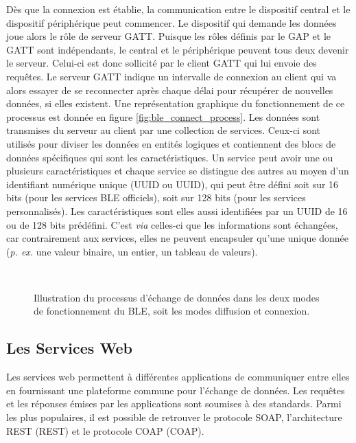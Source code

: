 Dès que la connexion est établie, la communication entre le dispositif central et le dispositif périphérique peut commencer. Le dispositif qui demande les données joue alors le rôle de serveur \acs{GATT}. Puisque les rôles définis par le \acs{GAP} et le \acs{GATT} sont indépendants, le central et le périphérique peuvent tous deux devenir le serveur. Celui-ci est donc sollicité par le client \acs{GATT} qui lui envoie des requêtes. Le serveur \acs{GATT} indique un intervalle de connexion au client qui va alors essayer de se reconnecter après chaque délai pour récupérer de nouvelles données, si elles existent. Une représentation graphique du fonctionnement de ce processus est donnée en figure \ref{fig:ble_connect_process}. Les données sont transmises du serveur au client par une collection de services. Ceux-ci sont utilisés pour diviser les données en entités logiques et contiennent des blocs de données spécifiques qui sont les caractéristiques. Un service peut avoir une ou plusieurs caractéristiques et chaque service se distingue des autres au moyen d’un identifiant numérique unique (\acl{UUID} ou \acs{UUID}), qui peut être défini soit sur 16 bits (pour les services BLE officiels), soit sur 128 bits (pour les services personnalisés). Les caractéristiques sont elles aussi identifiées par un \acs{UUID} de 16 ou de 128 bits prédéfini. C'est \textit{via} celles-ci que les informations sont échangées, car contrairement aux services, elles ne peuvent encapsuler qu'une unique donnée (\textit{p. ex.} une valeur binaire, un entier, un tableau de valeurs).

\begin{figure}[H]
	\centering
    \\[10pt]
	\caption{Illustration du processus d'échange de données dans les deux modes de fonctionnement du \acs{BLE}, soit les modes diffusion et connexion.}
\end{figure}

\subsection{Les Services Web}

Les services web permettent à différentes applications de communiquer entre elles en fournissant une plateforme commune pour l'échange de données. Les requêtes et les réponses émises par les applications sont soumises à des standards. Parmi les plus populaires, il est possible de retrouver le protocole \ac{SOAP}, l'architecture \acl{REST} (\acs{REST}) et le protocole \acl{COAP} (\acs{COAP}).

